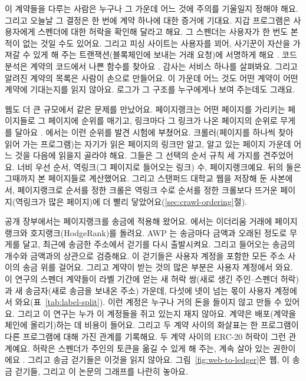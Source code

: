 이 계약들을 다루는 사람은 누구나 그 가운데 어느 것에 주의를 기울일지 정해야 해요. 그리고 오늘날 그 결정은 한 번에 계약 하나에 대한 증거에 기대요. 지갑 프로그램은 사용자에게 스펜더에 대한 허락을 확인해 달라고 해요. 그 스펜더는 사용자가 한 번도 본 적이 없는 것일 수도 있어요. 그리고 피싱 사이트는 사용자를 꾀어, 사기꾼이 자산을 가져갈 수 있게 해 주는 트랜잭션(블록체인에 보내는 거래 요청)에 서명하게 해요 \parencite{he2023txphishscope}. 코드 분석은 계약의 코드에서 나쁜 함수를 찾아요 \parencite{lin2024crpwarner}. 감사는 서비스 하나를 살펴봐요. 그리고 알려진 계약의 목록은 사람이 손으로 만들어요. 이 가운데 어느 것도 어떤 계약이 어떤 계약에 기대는지를 읽지 않아요. 로그가 그 구조를 누구에게나 보여 주는데도 그래요.

웹도 더 큰 규모에서 같은 문제를 만났어요. 페이지랭크는 어떤 페이지를 가리키는 페이지들로 그 페이지에 순위를 매기고, 링크마다 그 링크가 나온 페이지의 순위로 무게를 달아요 \parencite{page1999pagerank}. \textcite{cho1998crawling}에서는 이런 순위를 발견 시험에 부쳤어요. 크롤러(페이지를 하나씩 찾아 읽어 가는 프로그램)는 자기가 읽은 페이지의 링크만 알고, 알고 있는 페이지 가운데 어느 것을 다음에 읽을지 골라야 해요. 그들은 그 선택의 순서 규칙 세 가지를 견주었어요. 너비 우선 순서, 역링크(그 페이지로 들어오는 링크) 수, 페이지랭크예요. 뒤의 둘은 그때까지 본 페이지들로 계산했어요. 그리고 스탠퍼드 대학교 웹을 저장해 둔 사본에서, 페이지랭크로 순서를 정한 크롤은 역링크 수로 순서를 정한 크롤보다 뜨거운 페이지(역링크가 많은 페이지)에 더 빨리 닿았어요(\ref{sec:crawl-ordering}절).

공개 장부에서는 페이지랭크를 송금에 적용해 왔어요. \textcite{do2023hodgerank}에서는 이더리움 거래에 페이지랭크와 호지랭크(HodgeRank)를 돌려요. AWP \parencite{do2023awp}는 송금마다 금액과 오래된 정도로 무게를 달고, 최근에 송금한 주소에서 걷기를 다시 출발시켜요. 그리고 들어오는 송금의 개수와 금액과의 상관으로 검증해요. 이 걷기들은 사용자 계정을 포함한 모든 주소 사이의 송금 위를 걸어요. 그리고 계약이 받는 것의 많은 부분은 사용자 계정에서 와요. 이 연구의 스펜더 계약들이 라벨 기간에 얻는 새 허락 쌍(새로 생긴 주인–스펜더 허락)과 새 송금자(새로 송금을 보내온 주소) 가운데, 다섯에 넷이 넘는 몫이 사용자 계정에서 와요(표~\ref{tab:label-split}). 이런 계정은 누구나 거의 돈을 들이지 않고 만들 수 있어요. 그리고 이 연구는 누가 이 계정들을 쥐고 있는지 재지 않아요. 계약은 배포(계약을 체인에 올리기)하는 데 비용이 들어요. 그리고 두 계약 사이의 화살표는 한 프로그램이 다른 프로그램에 대해 가진 관계를 기록해요. 두 계약 사이의 ERC-20 허락이 그런 관계예요. 허락은 스펜더가 주인의 토큰을 옮길 수 있게 해 주는, 계속 살아 있는 권한이에요 \parencite{vogelsteller2015erc20}. 그리고 송금 걷기들은 이것을 읽지 않아요. 그림~\ref{fig:web-to-ledger}은 웹, 이 송금 걷기들, 그리고 이 논문의 그래프를 나란히 놓아요.

